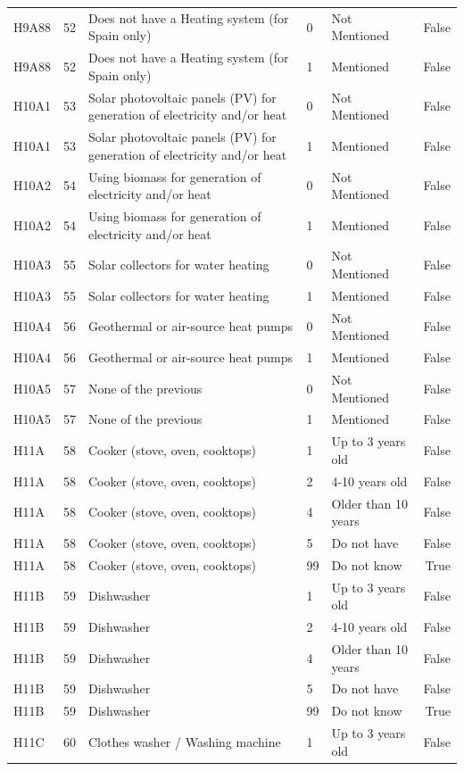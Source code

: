 \begin{tabular}{lrlllr}
H9A88 & 52 & Does not have a Heating system (for Spain only) & 0 & Not Mentioned & False \\
H9A88 & 52 & Does not have a Heating system (for Spain only) & 1 & Mentioned & False \\
H10A1 & 53 & Solar photovoltaic panels (PV) for generation of electricity and/or heat & 0 & Not Mentioned & False \\
H10A1 & 53 & Solar photovoltaic panels (PV) for generation of electricity and/or heat & 1 & Mentioned & False \\
H10A2 & 54 & Using biomass for generation of electricity and/or heat & 0 & Not Mentioned & False \\
H10A2 & 54 & Using biomass for generation of electricity and/or heat & 1 & Mentioned & False \\
H10A3 & 55 & Solar collectors for water heating & 0 & Not Mentioned & False \\
H10A3 & 55 & Solar collectors for water heating & 1 & Mentioned & False \\
H10A4 & 56 & Geothermal or air-source heat pumps & 0 & Not Mentioned & False \\
H10A4 & 56 & Geothermal or air-source heat pumps & 1 & Mentioned & False \\
H10A5 & 57 & None of the previous & 0 & Not Mentioned & False \\
H10A5 & 57 & None of the previous & 1 & Mentioned & False \\
H11A & 58 & Cooker (stove, oven, cooktops) & 1 & Up to 3 years old & False \\
H11A & 58 & Cooker (stove, oven, cooktops) & 2 & 4-10 years old & False \\
H11A & 58 & Cooker (stove, oven, cooktops) & 4 & Older than 10 years & False \\
H11A & 58 & Cooker (stove, oven, cooktops) & 5 & Do not have & False \\
H11A & 58 & Cooker (stove, oven, cooktops) & 99 & Do not know & True \\
H11B & 59 & Dishwasher & 1 & Up to 3 years old & False \\
H11B & 59 & Dishwasher & 2 & 4-10 years old & False \\
H11B & 59 & Dishwasher & 4 & Older than 10 years & False \\
H11B & 59 & Dishwasher & 5 & Do not have & False \\
H11B & 59 & Dishwasher & 99 & Do not know & True \\
H11C & 60 & Clothes washer / Washing machine & 1 & Up to 3 years old & False \\

\end{tabular}
